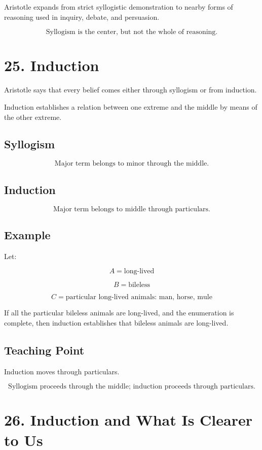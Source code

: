 \documentclass[12pt]{article}
\begin{document}
Aristotle expands from strict syllogistic demonstration to nearby forms of
reasoning used in inquiry, debate, and persuasion.

\[
\boxed{
\text{Syllogism is the center, but not the whole of reasoning.}
}
\]

\section*{25. Induction}

Aristotle says that every belief comes either through syllogism or from
induction.

Induction establishes a relation between one extreme and the middle by means of
the other extreme.

\subsection*{Syllogism}

\[
\text{Major term belongs to minor through the middle.}
\]

\subsection*{Induction}

\[
\text{Major term belongs to middle through particulars.}
\]

\subsection*{Example}

Let:

\[
A = \text{long-lived}
\]

\[
B = \text{bileless}
\]

\[
C = \text{particular long-lived animals: man, horse, mule}
\]

If all the particular bileless animals are long-lived, and the enumeration is
complete, then induction establishes that bileless animals are long-lived.

\subsection*{Teaching Point}

Induction moves through particulars.

\[
\boxed{
\text{Syllogism proceeds through the middle; induction proceeds through particulars.}
}
\]

\section*{26. Induction and What Is Clearer to Us}
\end{document}
